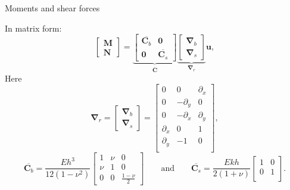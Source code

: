 \documentclass[aspectratio=169]{beamer}
\begin{document}
{
\color{white}
\begin{frame}{Moments and shear forces}
  \begin{block}{}
    In matrix form:
    $$\begin{bmatrix}
        \mathbf{M} \\ \mathbf{N}
      \end{bmatrix}=\underbrace{\begin{bmatrix}
          \overline{\boldsymbol{C}_b} & \mathbf 0                   \\
          \mathbf 0                   & \overline{\boldsymbol{C}_s}
        \end{bmatrix}}_\text{$\overline{\boldsymbol{C}}$}\underbrace{\begin{bmatrix}
          \boldsymbol\nabla_b \\ \boldsymbol\nabla_s
        \end{bmatrix}}_\text{$\boldsymbol\nabla_r$}\mathbf u,$$
    Here
    $$\boldsymbol\nabla_r=\begin{bmatrix}
        \boldsymbol\nabla_b \\ \boldsymbol\nabla_s
      \end{bmatrix}=\begin{bmatrix}
        0          & 0           & \partial_x \\
        0          & -\partial_y & 0          \\
        0          & -\partial_x & \partial_y \\
        \partial_x & 0           & 1          \\
        \partial_y & -1          & 0          \\
      \end{bmatrix},$$
    $$ \overline{\boldsymbol{C}_b}=\frac{Eh^3}{12(1 - \nu^2)}\begin{bmatrix}
        1   & \nu & 0                 \\
        \nu & 1   & 0                 \\
        0   & 0   & \frac{1 - \nu}{2}
      \end{bmatrix}\qquad\text{and}\qquad \overline{\boldsymbol{C}_s}= \frac{Ekh}{2(1 + \nu)}\begin{bmatrix}
        1 & 0 \\
        0 & 1 \\
      \end{bmatrix}.$$
  \end{block}
\end{frame}
}
\end{document}
